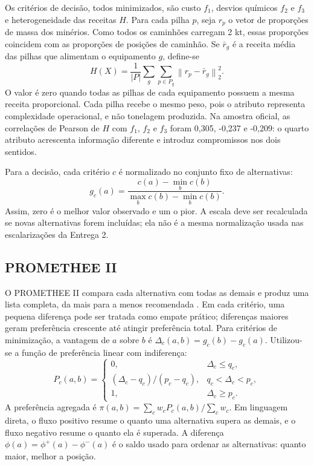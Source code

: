\documentclass[10pt,twocolumn,a4paper]{article}
\begin{document}
Os critérios de decisão, todos minimizados, são custo $f_1$, desvios químicos $f_2$ e $f_3$ e heterogeneidade das receitas $H$. Para cada pilha $p$, seja $r_p$ o vetor de proporções de massa dos minérios. Como todos os caminhões carregam 2 kt, essas proporções coincidem com as proporções de posições de caminhão. Se $\bar r_g$ é a receita média das pilhas que alimentam o equipamento $g$, define-se
\begin{equation}
H(X)=\frac{1}{|P|}\sum_g\sum_{p\in P_g}\left\|r_p-\bar r_g\right\|_2^2.
\end{equation}
O valor é zero quando todas as pilhas de cada equipamento possuem a mesma receita proporcional. Cada pilha recebe o mesmo peso, pois o atributo representa complexidade operacional, e não tonelagem produzida. Na amostra oficial, as correlações de Pearson de $H$ com $f_1$, $f_2$ e $f_3$ foram 0,305, -0,237 e -0,209: o quarto atributo acrescenta informação diferente e introduz compromissos nos dois sentidos.

Para a decisão, cada critério $c$ é normalizado no conjunto fixo de alternativas:
\begin{equation}
g_c(a)=\frac{c(a)-\min_b c(b)}{\max_b c(b)-\min_b c(b)}.
\end{equation}
Assim, zero é o melhor valor observado e um o pior. A escala deve ser recalculada se novas alternativas forem incluídas; ela não é a mesma normalização usada nas escalarizações da Entrega 2.

\subsection{PROMETHEE II}

O PROMETHEE II compara cada alternativa com todas as demais e produz uma lista completa, da mais para a menos recomendada \cite{promethee_ref}. Em cada critério, uma pequena diferença pode ser tratada como empate prático; diferenças maiores geram preferência crescente até atingir preferência total. Para critérios de minimização, a vantagem de $a$ sobre $b$ é $\Delta_c(a,b)=g_c(b)-g_c(a)$. Utilizou-se a função de preferência linear com indiferença:
\begin{equation}
P_c(a,b)=
\begin{cases}
0, & \Delta_c\le q_c,\\
(\Delta_c-q_c)/(p_c-q_c), & q_c<\Delta_c<p_c,\\
1, & \Delta_c\ge p_c.
\end{cases}
\end{equation}
A preferência agregada é $\pi(a,b)=\sum_c w_cP_c(a,b)/\sum_c w_c$. Em linguagem direta, o fluxo positivo resume o quanto uma alternativa supera as demais, e o fluxo negativo resume o quanto ela é superada. A diferença $\phi(a)=\phi^+(a)-\phi^-(a)$ é o saldo usado para ordenar as alternativas: quanto maior, melhor a posição.
\end{document}
